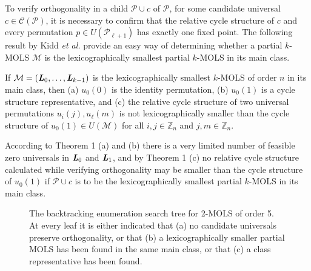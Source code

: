 \documentclass[11pt, a4paper]{article}
\renewcommand{\l}{ \mbox{\bf \emph{L}} }
\newcommand{\m}{\mathcal{ M}}
\newcommand{\p}{\mathcal{P}}
\newcounter{ls}
\begin{document}
To verify orthogonality in a child $ \p \cup c$ of $\p$, for some candidate universal $c \in \mathcal{C}(\p)$, it is necessary to confirm that the relative cycle structure of  $c$ and every permutation $p\in  U(\p_{\ell+1})$ has exactly one fixed point. The following result by Kidd \emph{et al.} \cite[Theorem 4.3.2]{Kidd2012} provide an easy way of determining whether a partial $k$-MOLS  $\m$ is the lexicographically smallest partial $k$-MOLS in its main class.
\begin{theorem}{\cite[Theorem 4.3.2]{Kidd2012} }
If $\m= (\l_0,     \ldots, \l_{k-1})$ is the lexicographically smallest $k$-MOLS of order $n$ in its main class, then (a) $u_0{(0)}$ is the identity permutation, (b) $u_0{(1)}$ is a cycle structure representative, and (c) the relative cycle structure of two universal permutations $u_i{(j)}, u_{\ell}{(m)}$ is not {lexicographically} smaller than the cycle structure of $u_0{(1)}\in U(\m)$ for all $i, j \in \mathbb{Z}_n$ and $j, m\in \mathbb{Z}_n$.
\end{theorem}
According to Theorem 1 (a) and (b) there is a very limited number of feasible zero universals in $\l_0$ and $\l_1$, and by Theorem 1 (c) no  relative cycle structure calculated while verifying orthogonality may be smaller than the cycle structure of $u_0{(1)}$ if $\p \cup c$ is to be the lexicographically smallest partial $k$-MOLS in its main class.
 
 \begin{figure}[b!]
 \centering 
  \begin{sideways}     
            
  \end{sideways}
  
  \vspace*{.4cm} \caption{The backtracking enumeration search tree for 2-MOLS of order 5. At every leaf it is either indicated that (a) no candidate universals preserve orthogonality, or that (b) a lexicographically smaller partial MOLS has been found in the same main class, or  that (c) a class representative has been found.}\label{figtree}
\end{figure}
\end{document}
